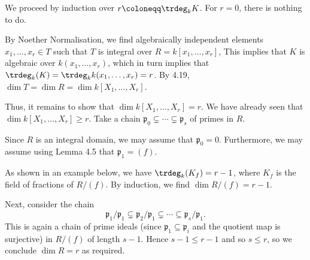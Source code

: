 We proceed by induction over $r\coloneqq \trdeg_k K$. For $r = 0$, there
is nothing to do.

By Noether Normalisation, we find algebraically independent elements
 $x_1, \ldots, x_r \in T$ such that $T$ is integral over $R = k[x_1, \ldots, x_r]$,
This implies that $K$ is algebraic over $k(x_1, \ldots, x_r)$, which in turn
implies that $\trdeg_k(K) = \trdeg_kk(x_1, \ldots, x_r) = r$.
By 4.19, $\dim T = \dim R = \dim k[X_1, \ldots, X_r]$.

Thus, it remains to show that $\dim k[X_1, \ldots, X_r] = r$. We have already
seen that $\dim k[X_1, \ldots, X_r] \geq r$.
Take
a chain $\mathfrak{p}_0 \subsetneq \cdots\subsetneq \mathfrak{p}_s$ of primes in $R$.

Since $R$ is an integral domain, we may assume that $\mathfrak{p}_0 = 0$. Furthermore,
we may assume using Lemma 4.5 that $\mathfrak{p}_1 = (f)$.

As shown in an example below, we have $\trdeg_k(K_f) = r-1$, where $K_f$ is the
field of fractions of $R/(f)$. By induction, we find $\dim R/(f) = r-1$.

Next, consider the chain
\[ \mathfrak{p}_1/\mathfrak{p}_1 \subsetneq \mathfrak{p}_2/\mathfrak{p}_1 \subsetneq\cdots\subseteq \mathfrak{p}_s/\mathfrak{p}_1. \]
This is again a chain of prime ideals (since $\mathfrak{p}_1 \subseteq \mathfrak{p}_i$
and the quotient map is surjective) in $R/(f)$ of length $s-1$. Hence
$s - 1 \leq r-1$ and so $s\leq r$, so we conclude $\dim R = r$ as required.
